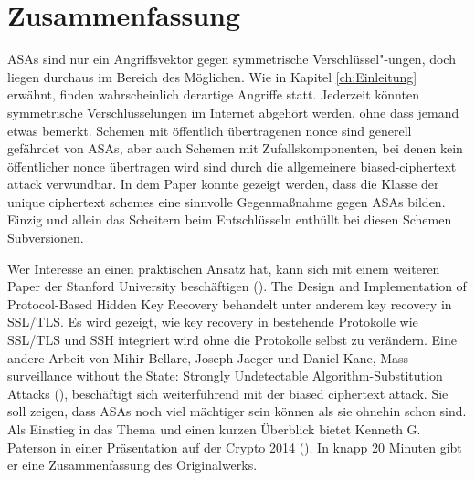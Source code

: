 \chapter{Zusammenfassung}
\label{ch:Zusammenfassung}

ASAs sind nur ein Angriffsvektor gegen symmetrische Verschlüssel"-ungen, doch liegen durchaus im Bereich des Möglichen. Wie in Kapitel \ref{ch:Einleitung} erwähnt, finden wahrscheinlich derartige Angriffe statt. Jederzeit könnten symmetrische Verschlüsselungen im Internet abgehört werden, ohne dass jemand etwas bemerkt. Schemen mit öffentlich übertragenen nonce sind generell gefährdet von ASAs, aber auch Schemen mit Zufallskomponenten, bei denen kein öffentlicher nonce übertragen wird sind durch die allgemeinere biased-ciphertext attack verwundbar. In dem Paper konnte gezeigt werden, dass die Klasse der unique ciphertext schemes eine sinnvolle Gegenmaßnahme gegen ASAs bilden. Einzig und allein das Scheitern beim Entschlüsseln enthüllt bei diesen Schemen Subversionen. 

Wer Interesse an einen praktischen Ansatz hat, kann sich mit einem weiteren Paper der Stanford University beschäftigen (\cite{GBPG}). The Design and Implementation of Protocol-Based Hidden Key Recovery behandelt unter anderem key recovery in SSL/TLS. Es wird gezeigt, wie key recovery in bestehende Protokolle wie SSL/TLS und SSH integriert wird ohne die Protokolle selbst zu verändern. Eine andere Arbeit von Mihir Bellare, Joseph Jaeger und Daniel Kane, Mass-surveillance without the State: Strongly Undetectable Algorithm-Substitution Attacks (\cite{BJK}), beschäftigt sich weiterführend mit der biased ciphertext attack. Sie soll zeigen, dass ASAs noch viel mächtiger sein können als sie ohnehin schon sind. Als Einstieg in das Thema und einen kurzen Überblick bietet Kenneth G. Paterson in einer Präsentation auf der Crypto 2014 (\cite{praesi}). In knapp 20 Minuten gibt er eine Zusammenfassung des Originalwerks.